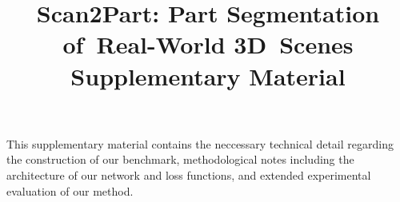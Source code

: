 \documentclass{article}
\title{Scan2Part: Part Segmentation\\of~Real-World 3D~Scenes\\Supplementary Material}
\begin{document}
\maketitle

This supplementary material contains the neccessary technical detail regarding the construction of our benchmark, methodological notes including the architecture of our network and loss functions, and extended experimental evaluation of our method.


\FloatBarrier
\clearpage


\FloatBarrier
\clearpage


\FloatBarrier
\clearpage



\end{document}
